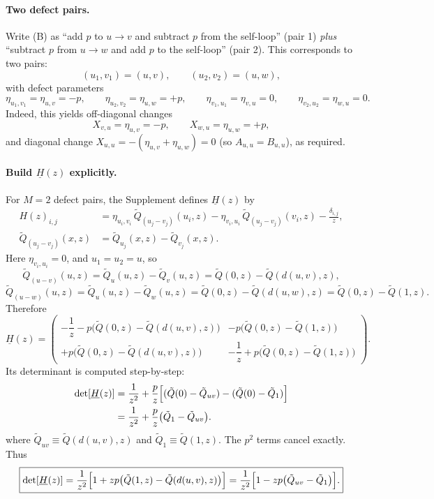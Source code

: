 \documentclass[11pt]{article}
\begin{document}
\paragraph{Two defect pairs.}
Write (B) as ``add $p$ to $u\to v$ and subtract $p$ from the self-loop'' (pair 1) \emph{plus}
``subtract $p$ from $u\to w$ and add $p$ to the self-loop'' (pair 2).
This corresponds to two pairs:
\[
(u_1,v_1)=(u,v),\qquad (u_2,v_2)=(u,w),
\]
with defect parameters
\[
\eta_{u_1,v_1}=\eta_{u,v}=-p,\qquad \eta_{u_2,v_2}=\eta_{u,w}=+p,
\qquad
\eta_{v_1,u_1}=\eta_{v,u}=0,\qquad \eta_{v_2,u_2}=\eta_{w,u}=0.
\]
Indeed, this yields off-diagonal changes
\[
X_{v,u}=\eta_{u,v}=-p,\qquad X_{w,u}=\eta_{u,w}=+p,
\]
and diagonal change $X_{u,u}=-(\eta_{u,v}+\eta_{u,w})=0$ (so $A_{u,u}=B_{u,u}$), as required.

\paragraph{Build $\underline{H}(z)$ explicitly.}
For $M=2$ defect pairs, the Supplement defines $\underline{H}(z)$ by
\[
\begin{aligned}
H(z)_{i,j}
&=
\eta_{u_i,v_i}\,\tilde Q_{(u_j-v_j)}(u_i,z)
-\eta_{v_i,u_i}\,\tilde Q_{(u_j-v_j)}(v_i,z)
-\frac{\delta_{i,j}}{z},\\
\tilde Q_{(u_j-v_j)}(x,z)
&=\tilde Q_{u_j}(x,z)-\tilde Q_{v_j}(x,z).
\end{aligned}
\]
Here $\eta_{v_i,u_i}=0$, and $u_1=u_2=u$, so
\[
\tilde Q_{(u-v)}(u,z)=\tilde Q_u(u,z)-\tilde Q_v(u,z)=\tilde Q(0,z)-\tilde Q(d(u,v),z),
\]
\[
\tilde Q_{(u-w)}(u,z)=\tilde Q_u(u,z)-\tilde Q_w(u,z)=\tilde Q(0,z)-\tilde Q(d(u,w),z)=\tilde Q(0,z)-\tilde Q(1,z).
\]
Therefore
\[
\underline{H}(z)=
\begin{pmatrix}
-\dfrac{1}{z}-p\bigl(\tilde Q(0,z)-\tilde Q(d(u,v),z)\bigr)
&
-p\bigl(\tilde Q(0,z)-\tilde Q(1,z)\bigr)
\\[2mm]
+p\bigl(\tilde Q(0,z)-\tilde Q(d(u,v),z)\bigr)
&
-\dfrac{1}{z}+p\bigl(\tilde Q(0,z)-\tilde Q(1,z)\bigr)
\end{pmatrix}.
\]
Its determinant is computed step-by-step:
\begin{align*}
\det[\underline{H}(z)]
&=\frac{1}{z^2}
+\frac{p}{z}\Bigl[(\tilde Q(0)-\tilde Q_{uv})-(\tilde Q(0)-\tilde Q_{1})\Bigr]\\
&=\frac{1}{z^2}
+\frac{p}{z}\bigl(\tilde Q_{1}-\tilde Q_{uv}\bigr).
\end{align*}
where $\tilde Q_{uv}\equiv \tilde Q(d(u,v),z)$ and $\tilde Q_{1}\equiv \tilde Q(1,z)$.
The $p^2$ terms cancel exactly.
Thus
\begin{equation}
\boxed{
\det[\underline{H}(z)]
=
\frac{1}{z^2}\Bigl[1+z p\bigl(\tilde Q(1,z)-\tilde Q(d(u,v),z)\bigr)\Bigr]
=
\frac{1}{z^2}\Bigl[1-z p\bigl(\tilde Q_{uv}-\tilde Q_{1}\bigr)\Bigr].
}
\label{eq:detH_B}
\end{equation}
\end{document}

